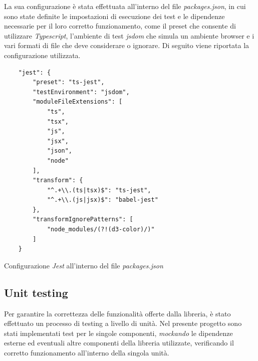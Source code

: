La sua configurazione è stata effettuata all'interno del file \textit{packages.json}, in cui sono state definite le impostazioni di
esecuzione dei test e le dipendenze necessarie per il loro corretto funzionamento, come il preset che consente di utilizzare \textit{Typescript},
l'ambiente di test \textit{jsdom} che simula un ambiente browser e i vari formati di file che deve considerare o ignorare. \newline
Di seguito viene riportata la configurazione utilizzata.
\begin{listing}[H]
    \begin{verbatim}
    "jest": {
        "preset": "ts-jest",
        "testEnvironment": "jsdom",
        "moduleFileExtensions": [
            "ts",
            "tsx",
            "js",
            "jsx",
            "json",
            "node"
        ],
        "transform": {
            "^.+\\.(ts|tsx)$": "ts-jest",
            "^.+\\.(js|jsx)$": "babel-jest"
        },
        "transformIgnorePatterns": [
            "node_modules/(?!(d3-color)/)"
        ]
    }
    \end{verbatim}
    \caption{Configurazione \textit{Jest} all'interno del file \textit{packages.json}}
    \label{listing:jest_config}
\end{listing}

\subsection{Unit testing}
Per garantire la correttezza delle funzionalità offerte dalla libreria, è stato effettuato un processo di testing a livello di unità. \newline
Nel presente progetto sono stati implementati test per le singole componenti, \textit{mockando} le dipendenze esterne ed eventuali altre componenti
della libreria utilizzate, verificando il corretto funzionamento all'interno della singola unità.

